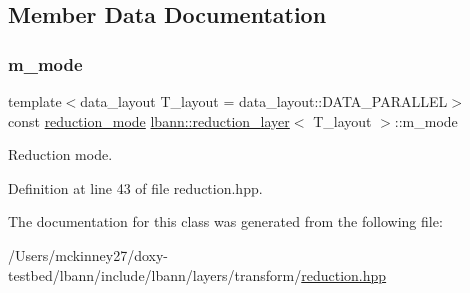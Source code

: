 \subsection{Member Data Documentation}
\mbox{\label{classlbann_1_1reduction__layer_aa8c753154fec05a00ede9217df3ba638}} 
\subsubsection{\texorpdfstring{m\+\_\+mode}{m\_mode}}
{\footnotesize\ttfamily template$<$data\+\_\+layout T\+\_\+layout = data\+\_\+layout\+::\+D\+A\+T\+A\+\_\+\+P\+A\+R\+A\+L\+L\+EL$>$ \\
const \hyperlink{namespacelbann_a5975e1fb530a267728bfb01dc5c1be9b}{reduction\+\_\+mode} \hyperlink{classlbann_1_1reduction__layer}{lbann\+::reduction\+\_\+layer}$<$ T\+\_\+layout $>$\+::m\+\_\+mode\hspace{0.3cm}{\ttfamily [private]}}

Reduction mode. 

Definition at line 43 of file reduction.\+hpp.



The documentation for this class was generated from the following file\+:\begin{DoxyCompactItemize}
\item 
/\+Users/mckinney27/doxy-\/testbed/lbann/include/lbann/layers/transform/\hyperlink{reduction_8hpp}{reduction.\+hpp}\end{DoxyCompactItemize}
